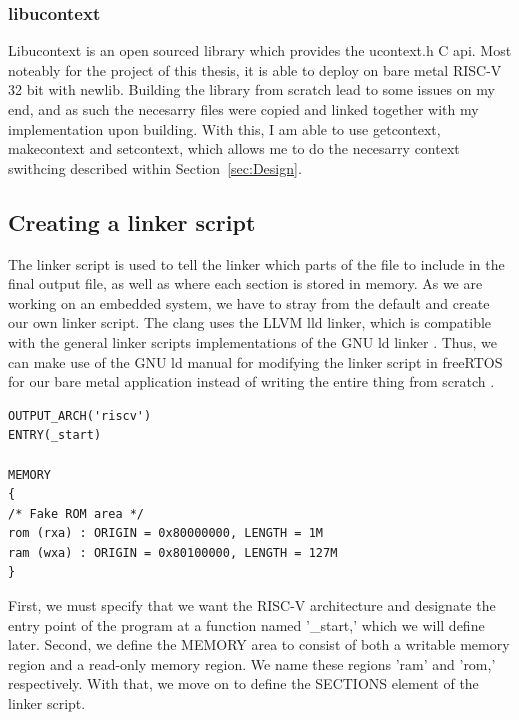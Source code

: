 \subsubsection*{libucontext}
Libucontext is an open sourced library which provides the ucontext.h C api. Most
noteably for the project of this thesis, it is able to deploy on bare metal
RISC-V 32 bit with newlib. Building the library from scratch lead to some issues
on my end, and as such the necesarry files were copied and linked together with
my implementation upon building. With this, I am able to use getcontext,
makecontext and setcontext, which allows me to do the necesarry context
swithcing described within Section~\ref{sec:Design}.


\subsection{Creating a linker script}
The linker script is used to tell the linker which parts of the file to include
in the final output file, as well as where each section is stored in memory. As
we are working on an embedded system, we have to stray from the default and
create our own linker script. The clang uses the LLVM lld linker, which is
compatible with the general linker scripts implementations of the GNU ld linker
\cite{llvm-org-linker}. Thus, we can make use of the GNU ld manual for modifying
the linker script in freeRTOS for our bare metal application instead of writing
the entire thing from scratch \cite{GNU-linker}.

\begin{lstlisting}[caption=Memory area defined in linker script]
OUTPUT_ARCH('riscv')
ENTRY(_start)

MEMORY
{
/* Fake ROM area */
rom (rxa) : ORIGIN = 0x80000000, LENGTH = 1M
ram (wxa) : ORIGIN = 0x80100000, LENGTH = 127M
}
\end{lstlisting}
First, we must specify that we want the RISC-V architecture and designate the
entry point of the program at a function named '\_start,' which we will define
later. Second, we define the MEMORY area to consist of both a writable memory
region and a read-only memory region. We name these regions 'ram' and 'rom,'
respectively. With that, we move on to define the SECTIONS element of the linker
script.

